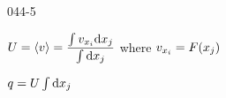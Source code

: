 \begin{mitframe}{044-5}
\begin{listone}
	\item $\uvel=\langle\vvel\rangle=\dfrac{\int\vvel_{\specfrac{i}}\mathrm{d}\specfrac{j}}{\int\mathrm{d}\specfrac{j}}$ where $\vvel_{\specfrac{i}}=\force(\specfrac{j})$
    \item $\heatflux=\uvel\int\mathrm{d}\specfrac{j}$
\end{listone}        
\end{mitframe}